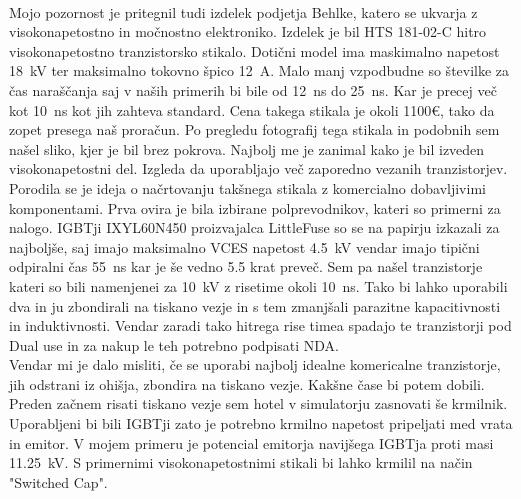 \documentclass[a4paper,twoside,openright,12pt,slovene]{book}
\begin{document}
    ~\\Mojo pozornost je pritegnil tudi izdelek podjetja Behlke, katero se ukvarja z visokonapetostno in močnostno elektroniko. Izdelek je bil HTS 181-02-C hitro visokonapetostno tranzistorsko stikalo. Dotični model ima maskimalno napetost \SI{18}{\kilo\volt} ter maksimalno tokovno špico \SI{12}{\ampere}. Malo manj vzpodbudne so številke za čas naraščanja saj v naših primerih bi bile od \SI{12}{\nano\second} do \SI{25}{\nano\second}. Kar je precej več kot \SI{10}{\nano\second} kot jih zahteva standard. Cena takega stikala je okoli 1100\euro , tako da zopet presega naš proračun. Po pregledu fotografij tega stikala in podobnih sem našel sliko, kjer je bil brez pokrova. Najbolj me je zanimal kako je bil izveden visokonapetostni del. Izgleda da uporabljajo več zaporedno vezanih tranzistorjev. Porodila se je ideja o načrtovanju takšnega stikala z komercialno dobavljivimi komponentami.
    Prva ovira je bila izbirane polprevodnikov, kateri so primerni za nalogo. IGBTji IXYL60N450 proizvajalca LittleFuse so se na papirju izkazali za najboljše, saj imajo maksimalno VCES napetost \SI{4.5}{\kilo\volt} vendar imajo tipični odpiralni čas \SI{55}{\nano\second} kar je še vedno 5.5 krat preveč. 
    Sem pa našel tranzistorje kateri so bili namenjenei za \SI{10}{\kilo\volt} z risetime okoli \SI{10}{\nano\second}. Tako bi lahko uporabili dva in ju zbondirali na tiskano vezje in s tem zmanjšali parazitne kapacitivnosti in induktivnosti. Vendar zaradi tako hitrega rise timea spadajo te tranzistorji pod Dual use in za nakup le teh potrebno podpisati NDA.
    \\Vendar mi je dalo misliti, če se uporabi najbolj idealne komericalne tranzistorje, jih odstrani iz ohišja, zbondira na tiskano vezje. Kakšne čase bi potem dobili. Preden začnem risati tiskano vezje sem hotel v simulatorju zasnovati še krmilnik. Uporabljeni bi bili IGBTji zato je potrebno krmilno napetost pripeljati med vrata in emitor. V mojem primeru je potencial emitorja navijšega IGBTja proti masi \SI{11.25}{\kilo\volt}. S primernimi visokonapetostnimi stikali bi lahko krmilil na način "Switched Cap".
\end{document}
